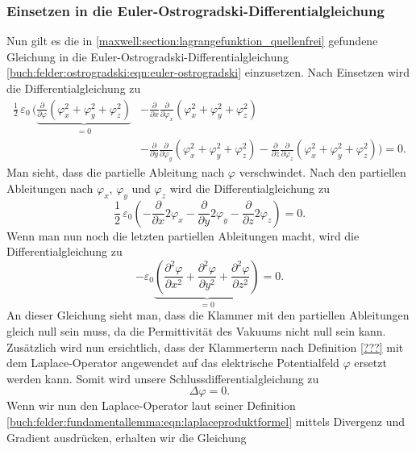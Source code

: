 \subsubsection{Einsetzen in die Euler-Ostrogradski-Differentialgleichung}
Nun gilt es die in \eqref{maxwell:section:lagrangefunktion_quellenfrei} gefundene Gleichung in die Euler-Ostrogradski-Differentialgleichung \eqref{buch:felder:ostrogradski:eqn:euler-ostrogradski} einzusetzen.
Nach Einsetzen wird die Differentialgleichung zu
\begin{align*}
\frac{1}{2}\,\varepsilon_0\,\biggl(\underbrace{\frac{\partial}{\partial\varphi}\left(\varphi_x^2 + \varphi_y^2 + \varphi_z^2\right)}_{\displaystyle=0} &- \frac{\partial}{\partial x}\frac{\partial}{\partial \varphi_x}\left(\varphi_x^2 + \varphi_y^2 + \varphi_z^2\right)\\
&- \frac{\partial}{\partial y}\frac{\partial}{\partial \varphi_y}\left(\varphi_x^2 + \varphi_y^2 + \varphi_z^2\right) - 
\frac{\partial}{\partial z}\frac{\partial}{\partial \varphi_z}\left(\varphi_x^2 + \varphi_y^2 + \varphi_z^2\right)\biggr)
=
0.
\end{align*}
Man sieht, dass die partielle Ableitung nach $\varphi$ verschwindet.
Nach den partiellen Ableitungen nach $\varphi_x$, $\varphi_y$ und $\varphi_z$ wird die Differentialgleichung zu
\[
\frac{1}{2}\,\varepsilon_0\left(-\frac{\partial}{\partial x}2\varphi_x - \frac{\partial}{\partial y}2\varphi_y - \frac{\partial}{\partial z}2\varphi_z\right)
=
0.
\]
Wenn man nun noch die letzten partiellen Ableitungen macht, wird die Differentialgleichung zu
\begin{equation}
	- \varepsilon_0\underbrace{\left(\frac{\partial^2\varphi}{\partial x^2} + \frac{\partial^2\varphi}{\partial y^2} + \frac{\partial^2\varphi}{\partial z^2}\right)}_{\displaystyle=0}
	=
	0.
	\label{maxwell:section:laplace_gleichung_1}
\end{equation}
An dieser Gleichung sieht man, dass die Klammer mit den partiellen Ableitungen gleich null sein muss, da die Permittivität des Vakuums nicht null sein kann.
Zusätzlich wird nun ersichtlich, dass der Klammerterm nach Definition \eqref{???} mit dem Laplace-Operator angewendet auf das elektrische Potentialfeld $\varphi$ ersetzt werden kann.
Somit wird unsere Schlussdifferentialgleichung zu
\begin{equation}
	\Delta\varphi
	=
	0.
	\label{maxwell:section:laplace_gleichung_2}
\end{equation}
Wenn wir nun den Laplace-Operator laut seiner Definition \eqref{buch:felder:fundamentallemma:eqn:laplaceproduktformel} mittels Divergenz und Gradient ausdrücken, erhalten wir die Gleichung
